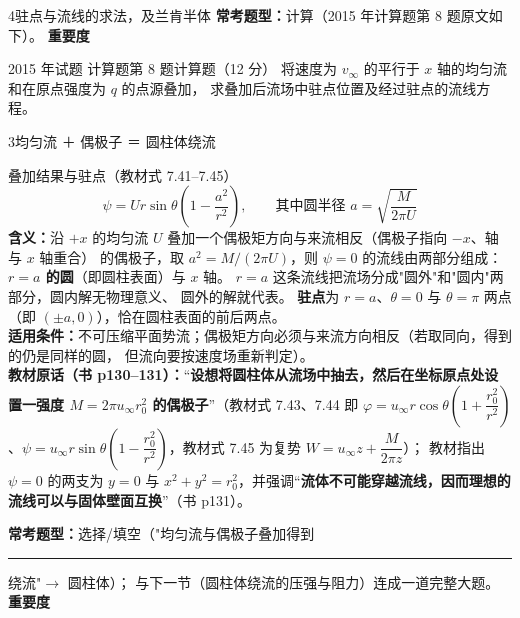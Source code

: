 \begin{kaodian}{4}{驻点与流线的求法，及兰肯半体}
\textbf{常考题型：}计算（2015 年计算题第 8 题原文如下）。
\textbf{重要度 }\quad{}\quad{}

\begin{zhenti}{2015 年试题 计算题第 8 题}{计算题（12 分）}
将速度为 $v_\infty$ 的平行于 $x$ 轴的均匀流和在原点强度为 $q$ 的点源叠加，
求叠加后流场中驻点位置及经过驻点的流线方程。
\end{zhenti}
\end{kaodian}

\begin{kaodian}{3}{均匀流 ＋ 偶极子 ＝ 圆柱体绕流}
\begin{gongshi}{叠加结果与驻点（教材式 7.41--7.45）}
\[ \psi=U r\sin\theta\left(1-\frac{a^2}{r^2}\right),\qquad\text{其中圆半径 } a=\sqrt{\frac{M}{2\pi U}} \]
\textbf{含义：}沿 $+x$ 的均匀流 $U$ 叠加一个偶极矩方向与来流相反（偶极子指向 $-x$、轴与 $x$ 轴重合）
的偶极子，取 $a^2=M/(2\pi U)$，则 $\psi=0$ 的流线由两部分组成：
\textbf{$r=a$ 的圆}（即圆柱表面）与 $x$ 轴。
$r=a$ 这条流线把流场分成"圆外"和"圆内"两部分，圆内解无物理意义、
圆外的解就代表。
\textbf{驻点}为 $r=a$、$\theta=0$ 与 $\theta=\pi$ 两点（即 $(\pm a,0)$），恰在圆柱表面的前后两点。\\
\textbf{适用条件：}不可压缩平面势流；偶极矩方向必须与来流方向相反（若取同向，得到的仍是同样的圆，
但流向要按速度场重新判定）。\\
\textbf{教材原话（书 p130--131）：}“\textbf{设想将圆柱体从流场中抽去，然后在坐标原点处设置一强度 $M=2\pi u_\infty r_0^2$ 的偶极子}”（教材式 7.43、7.44 即 $\varphi=u_\infty r\cos\theta\left(1+\dfrac{r_0^2}{r^2}\right)$、$\psi=u_\infty r\sin\theta\left(1-\dfrac{r_0^2}{r^2}\right)$，教材式 7.45 为复势 $W=u_\infty z+\dfrac{M}{2\pi z}$）；
教材指出 $\psi=0$ 的两支为 $y=0$ 与 $x^2+y^2=r_0^2$，并强调“\textbf{流体不可能穿越流线，因而理想的流线可以与固体壁面互换}”（书 p131）。
\end{gongshi}
\textbf{常考题型：}选择/填空（"均匀流与偶极子叠加得到\rule{1.8cm}{0.4pt}绕流"$\to$ 圆柱体）；
与下一节（圆柱体绕流的压强与阻力）连成一道完整大题。
\textbf{重要度 }\quad{}\quad{}
\end{kaodian}

